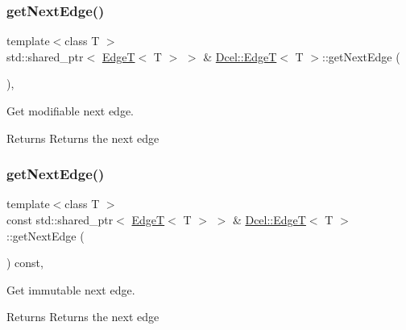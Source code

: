 \subsubsection{\texorpdfstring{get\+Next\+Edge()}{getNextEdge()}\hspace{0.1cm}{\footnotesize\ttfamily [1/2]}}
{\footnotesize\ttfamily template$<$class T $>$ \\
std\+::shared\+\_\+ptr$<$ \hyperlink{classDcel_1_1EdgeT}{EdgeT}$<$ T $>$ $>$ \& \hyperlink{classDcel_1_1EdgeT}{Dcel\+::\+EdgeT}$<$ T $>$\+::get\+Next\+Edge (\begin{DoxyParamCaption}{ }\end{DoxyParamCaption})\hspace{0.3cm}{\ttfamily [inline]}, {\ttfamily [noexcept]}}



Get modifiable next edge. 

\begin{DoxyReturn}{Returns}
Returns the next edge 
\end{DoxyReturn}
\mbox{\label{classDcel_1_1EdgeT_a6b50d3dd8ab3e2cda28819f6e4be9769}} 
\subsubsection{\texorpdfstring{get\+Next\+Edge()}{getNextEdge()}\hspace{0.1cm}{\footnotesize\ttfamily [2/2]}}
{\footnotesize\ttfamily template$<$class T $>$ \\
const std\+::shared\+\_\+ptr$<$ \hyperlink{classDcel_1_1EdgeT}{EdgeT}$<$ T $>$ $>$ \& \hyperlink{classDcel_1_1EdgeT}{Dcel\+::\+EdgeT}$<$ T $>$\+::get\+Next\+Edge (\begin{DoxyParamCaption}{ }\end{DoxyParamCaption}) const\hspace{0.3cm}{\ttfamily [inline]}, {\ttfamily [noexcept]}}



Get immutable next edge. 

\begin{DoxyReturn}{Returns}
Returns the next edge 
\end{DoxyReturn}
\mbox{\label{classDcel_1_1EdgeT_aaa6ae21b177a7661ba61ad2b63ed47f3}} 
